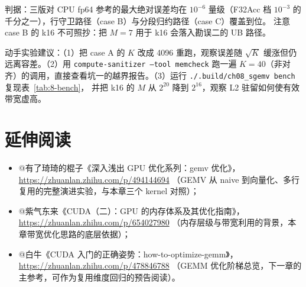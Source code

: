判据：三版对 CPU fp64 参考的最大绝对误差均在 $10^{-6}$ 量级（F32Acc 档
$10^{-3}$ 的千分之一），行守卫路径（case B）与分段归约路径（case C）覆盖到位。
注意 case B 的 k16 不可照抄：把 $M{=}7$ 用于 k16 会落入勘误二的 UB 路径。

动手实验建议：（1）把 case A 的 $K$ 改成 4096 重跑，观察误差随 $\sqrt{K}$
缓涨但仍远离容差。（2）用 \texttt{compute-sanitizer --tool memcheck} 跑一遍
$K = 40$（非对齐）的调用，直接查看坑一的越界报告。（3）运行
\texttt{.\allowbreak{}/\allowbreak{}.\allowbreak{}build/\allowbreak{}ch08\_\allowbreak{}sgemv bench} 复现表~\ref{tab:8-bench}，
并把 k16 的 $M$ 从 $2^{20}$ 降到 $2^{16}$，观察 L2 驻留如何使有效带宽虚高。

\section*{延伸阅读}

\begin{itemize}
  \item @有了琦琦的棍子《深入浅出 GPU 优化系列：gemv 优化》，
        \url{https://zhuanlan.zhihu.com/p/494144694}
        （GEMV 从 naive 到向量化、多行复用的完整演进实验，与本章三个 kernel 对照）；
  \item @紫气东来《CUDA（二）：GPU 的内存体系及其优化指南》，
        \url{https://zhuanlan.zhihu.com/p/654027980}
        （内存层级与带宽利用的背景，本章带宽优化思路的底层依据）；
  \item @白牛《CUDA 入门的正确姿势：how-to-optimize-gemm》，
        \url{https://zhuanlan.zhihu.com/p/478846788}
        （GEMM 优化阶梯总览，下一章的主参考，可作为复用维度回归的预告阅读）。
\end{itemize}
